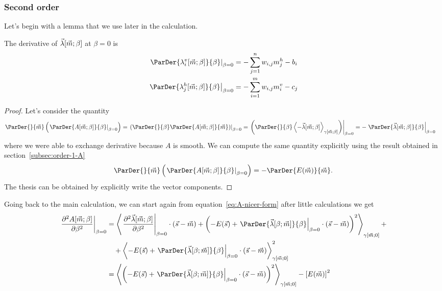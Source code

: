 \subsubsection{Second order}
Let's begin with a lemma that we use later in the calculation.
\begin{lemma} \label{lem:first-derivative-lambda}
  The derivative of \(\vec{\lambda}{\left[\vec{m};\beta\right]}\) at \(\beta = 0\) is
  \begin{align*}
    \left.\ParDer{\lvim{\beta}}{\beta}\right|_{\beta=0} &= -\sum_{j=1}^n w_{i,j}m^h_j-b_i\\
    \left.\ParDer{\lhjm{\beta}}{\beta}\right|_{\beta=0} &= -\sum_{i=1}^m w_{i,j}m^v_i-c_j
  \end{align*}
  \begin{proof}
    Let's consider the quantity
    \begin{align*}
      \ParDer{}{\vec{m}}\left(\left.\ParDer{A{\left[\vec{m};\beta\right]}}{\beta}\right|_{\beta=0}\right)
      &= \left.\left(\ParDer{}{\beta}\ParDer{A{\left[\vec{m};\beta\right]}}{\vec{m}}\right)\right|_{\beta=0}
      = \left.\left(\ParDer{}{\beta}\Gmean{-\Lambd{\vec{m}}{\beta}}{\vec{m}}{\beta}\right)\right|_{\beta=0}
      = -\left.\ParDer{\Lambd{\vec{m}}{\beta}}{\beta}\right|_{\beta=0}
    \end{align*}
    where we were able to exchange derivative because \(A\) is smooth.
    We can compute the same quantity explicitly using the result obtained in
    section~\ref{subsec:order-1-A}
    \[
      \ParDer{}{\vec{m}}\left(\left.\ParDer{A{\left[\vec{m};\beta\right]}}{\beta}\right|_{\beta=0}\right)
      = -\ParDer{E{(\vec{m})}}{\vec{m}}.
    \]
    The thesis can be obtained by explicitly write the vector components.
  \end{proof}
\end{lemma}
Going back to the main calculation, we can start again from equation~\eqref{eq:A-nicer-form} after little calculations we get
\begin{align*}
  \left.\frac{\partial^2A{\left[\vec{m};\beta\right]}}{\partial\beta^2}\right|_{\beta=0}
  &= \Gmean{
       \left.\frac{\partial^2\vec{\lambda}{\left[\vec{m};\beta\right]}}{\partial\beta^2}\right|_{\beta=0}
         \cdot (\vec{s}-\vec{m})
       +\left(-E{(\vec{s})} +   
          \left.\ParDer{\Lambd{\beta}{\vec{m}}}{\beta}\right|_{\beta=0}\cdot(\vec{s}-\vec{m})\right)^2
     }{\vec{m}}{0}+\\
  &\quad+ \Gmean{
          -E{(\vec{s})}+\left.\ParDer{\Lambd{\beta}{\vec{m}}}{\beta}\right|_{\beta=0}\cdot(\vec{s}-\vec{m})
       }{\vec{m}}{0}^2 \\
  &= \Gmean{
       \left(-E{(\vec{s})} +   
        \left.\ParDer{\Lambd{\beta}{\vec{m}}}{\beta}\right|_{\beta=0}\cdot(\vec{s}-\vec{m})\right)^2
     }{\vec{m}}{0} - \left[E{(\vec{m})}\right]^2
\end{align*}
